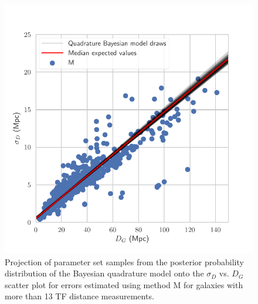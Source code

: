 \documentclass[a4paper,fleqn,usenatbib]{mnras}
\begin{document}
\begin{figure}
	\includegraphics[scale=0.7]{drawsq2}
    \caption{Projection of parameter set samples from the posterior probability distribution of the Bayesian quadrature model onto the $\sigma_D$ vs. $D_G$  scatter plot for errors estimated using method M for galaxies with more than 13 TF distance measurements.}
    \label{fig:drawsq2}
\end{figure}
\end{document}
